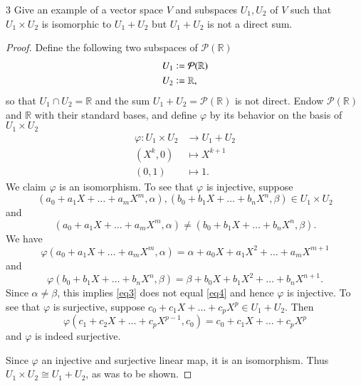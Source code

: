 \documentclass{extarticle}
\newenvironment{problem}[1]{\begin{prob*}{#1}{}}{\end{prob*}}
\newcommand{\R}{\mathbb{R}}
\newcommand{\poly}{\mathcal{P}}
\newcommand{\defeq}{\vcentcolon=}
\begin{document}
\begin{problem}{3}
Give an example of a vector space $V$ and subspaces $U_1,U_2$ of $V$ such that $U_1\times U_2$ is isomorphic to $U_1 + U_2$ but $U_1 + U_2$ is not a direct sum.
\end{problem}
\begin{proof}
Define the following two subspaces of $\poly(\R)$
\begin{align*}
U_1 &\defeq \poly(\R)\\
U_2 &\defeq \R,
\end{align*}
so that $U_1\cap U_2 = \R$ and the sum $U_1 + U_2 = \poly(\R)$ is not direct.  Endow $\poly(\R)$ and $\R$ with their standard bases, and define $\varphi$ by its behavior on the basis of $U_1\times U_2$
\begin{align*}
\varphi:U_1\times U_2 &\to U_1 + U_2\\
            \left(X^k, 0\right) &\mapsto X^{k + 1}\\
            (0, 1) &\mapsto 1.
\end{align*}
We claim $\varphi$ is an isomorphism.  To see that $\varphi$ is injective, suppose 
\begin{equation*}
\left(a_0 + a_1X + \dots + a_mX^m, \alpha\right), \left(b_0 + b_1X + \dots + b_nX^n, \beta\right)\in U_1\times U_2
\end{equation*}
and 
\begin{equation*}
\left(a_0 + a_1X + \dots + a_mX^m, \alpha\right) \neq \left(b_0 + b_1X + \dots + b_nX^n, \beta\right).
\end{equation*}
We have
\begin{equation}\label{eq3}
\varphi\left(a_0 + a_1X + \dots + a_mX^m, \alpha\right) = \alpha + a_0X + a_1X^2 + \dots + a_mX^{m + 1}
\end{equation}
and 
\begin{equation}\label{eq4}
\varphi\left(b_0 + b_1X + \dots + b_nX^n, \beta\right) = \beta + b_0X + b_1X^2 + \dots + b_nX^{n + 1}.
\end{equation}
Since $\alpha\neq \beta$, this implies \eqref{eq3} does not equal \eqref{eq4} and hence $\varphi$ is injective.  To see that $\varphi$ is surjective, suppose $c_0 + c_1X + \dots + c_pX^p\in U_1 + U_2$.  Then 
\begin{equation*}
\varphi\left(c_1 + c_2X + \dots + c_pX^{p - 1}, c_0\right) = c_0 + c_1X + \dots + c_pX^p
\end{equation*}
and $\varphi$ is indeed surjective.  
\par Since $\varphi$ an injective and surjective linear map, it is an isomorphism.  Thus $U_1\times U_2\cong U_1 + U_2$, as was to be shown.
\end{proof}
\end{document}
